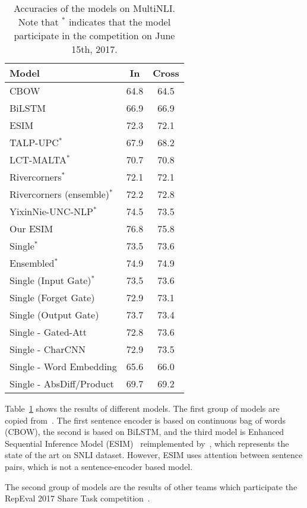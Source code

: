 \documentclass[11pt,letterpaper]{article}
\begin{document}
\begin{table}[t!]
\renewcommand{\arraystretch}{0.9}
\centering
\begin{tabular}{|l|c|c|}
\hline
Model     & In & Cross\\
\hline
CBOW & 64.8 & 64.5 \\
BiLSTM &  66.9 & 66.9\\
ESIM & 72.3 & 72.1\\
\hline
TALP-UPC$^*$ & 67.9 & 68.2 \\
LCT-MALTA$^*$& 70.7 & 70.8 \\
Rivercorners$^*$& 72.1 & 72.1\\
Rivercorners (ensemble)$^*$& 72.2 & 72.8 \\
YixinNie-UNC-NLP$^*$ & 74.5 & 73.5 \\
\hline
Our ESIM & 76.8 & 75.8 \\
Single$^*$ & 73.5 & 73.6 \\
Ensembled$^*$ & 74.9 & 74.9 \\
\hline
Single (Input Gate)$^*$ & 73.5 & 73.6 \\
Single (Forget Gate) & 72.9 & 73.1 \\
Single (Output Gate) & 73.7 & 73.4 \\
\hline
Single - Gated-Att & 72.8 & 73.6 \\
Single - CharCNN & 72.9 & 73.5 \\
Single - Word Embedding & 65.6 & 66.0 \\
Single - AbsDiff/Product & 69.7 & 69.2 \\
\hline
\end{tabular}
\caption{Accuracies of the models on MultiNLI. Note that $^*$ indicates that the model participate in the competition on June 15th, 2017.}
\label{tab:result}
\end{table}

Table~\ref{tab:result} shows the results of different models. The first group of models are copied from~\citet{DBLP:journals/corr/WilliamsNB17}. The first sentence encoder is based on continuous bag of words (CBOW), the second is based on BiLSTM, and the third model is Enhanced Sequential Inference Model (ESIM)~\citep{DBLP:journals/corr/ChenZLWJ16}
reimplemented by~\citet{DBLP:journals/corr/WilliamsNB17}, which represents the state of the art on SNLI dataset. However, ESIM uses attention between sentence pairs, which is not a sentence-encoder based model.

The second group of models are the results of other teams which participate the RepEval 2017 Share Task competition~\citep{nangia2017repeval}. 
\end{document}
